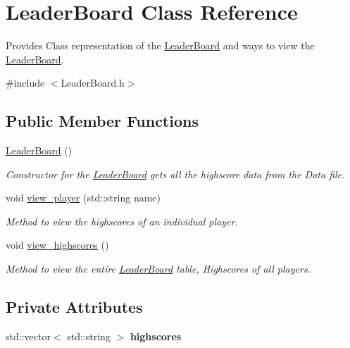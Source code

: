 \hypertarget{classLeaderBoard}{}\section{Leader\+Board Class Reference}
\label{classLeaderBoard}


Provides Class representation of the \hyperlink{classLeaderBoard}{Leader\+Board} and ways to view the \hyperlink{classLeaderBoard}{Leader\+Board}.  




{\ttfamily \#include $<$Leader\+Board.\+h$>$}

\subsection*{Public Member Functions}
\begin{DoxyCompactItemize}
\item 
\hyperlink{classLeaderBoard_adc7b14c64cca2cddc9cb951f1d5779db}{Leader\+Board} ()
\begin{DoxyCompactList}\small\item\em Constructor for the \hyperlink{classLeaderBoard}{Leader\+Board} gets all the highscore data from the Data file. \end{DoxyCompactList}\item 
void \hyperlink{classLeaderBoard_ae5abb64b73518c25bc32809b5547a87c}{view\+\_\+player} (std\+::string name)
\begin{DoxyCompactList}\small\item\em Method to view the highscores of an individual player. \end{DoxyCompactList}\item 
void \hyperlink{classLeaderBoard_abaa849f35f01657971f8962e9f754ef6}{view\+\_\+highscores} ()
\begin{DoxyCompactList}\small\item\em Method to view the entire \hyperlink{classLeaderBoard}{Leader\+Board} table, Highscores of all players. \end{DoxyCompactList}\end{DoxyCompactItemize}
\subsection*{Private Attributes}
\begin{DoxyCompactItemize}
\item 
\mbox{\label{classLeaderBoard_a558a066c4e7b5b2cfe36f14eacc95e62}} 
std\+::vector$<$ std\+::string $>$ {\bfseries highscores}
\end{DoxyCompactItemize}


